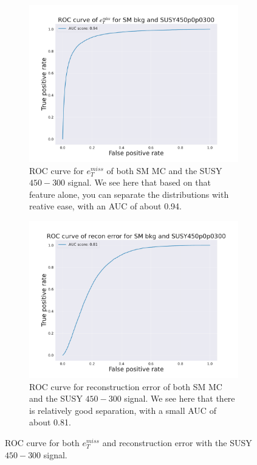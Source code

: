 \begin{figure}[h!]
    \centering
    \begin{subfigure}{.45\textwidth}
    \includegraphics[width=\textwidth]{Figures/AE_testing/big/roc_curve_etmiss_450p0p0300.pdf}
        \caption{ROC curve for $e_T^{miss}$ of both SM MC and the SUSY $450-300$ signal. We see here that based on that feature alone, you can separate 
        the distributions with reative ease, with an AUC of about 0.94. }
    \end{subfigure}
    \hfill
    \begin{subfigure}{.45\textwidth}
        \includegraphics[width=\textwidth]{Figures/AE_testing/big/roc_curve_recon_err_450p0p0300.pdf}
            \caption{ROC curve for reconstruction error of both SM MC and the SUSY $450-300$ signal. We see here that there is relatively good separation,
            with a small AUC of about 0.81.}
        \end{subfigure}
        \hfill
    \caption{ROC curve for both $e_T^{miss}$ and reconstruction error with the SUSY $450-300$ signal. }
    \label{fig:roc_susy_450_300}
\end{figure}



